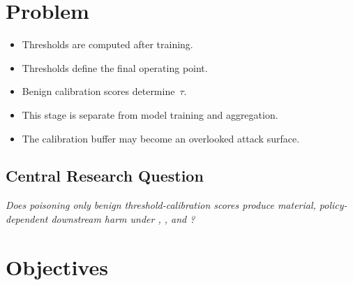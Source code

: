 
\section{Problem}

\begin{itemize}
  \item Thresholds are computed after training.
  \item Thresholds define the final operating point.
  \item Benign calibration scores determine~$\tau$.
  \item This stage is separate from model training and aggregation.
  \item The calibration buffer may become an overlooked attack surface.
\end{itemize}

\subsection{Central Research Question}

\begin{tcolorbox}[callout]
\itshape
Does poisoning only benign threshold-calibration scores produce material,
policy-dependent downstream harm under ,
, and ?
\end{tcolorbox}

\section{Objectives}

